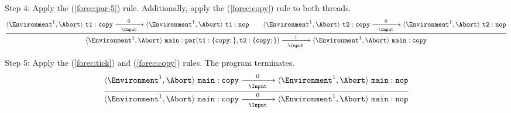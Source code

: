 \noindent
Step 4: Apply the (\ref{forec:par-5}) rule. Additionally, 
apply the (\ref{forec:copy}) rule to both threads.
{\footnotesize
\begin{equation*}
	\frac{
			\langle \Environment^1, \Abort \rangle ~ \mathtt{t1: copy}
				\xrightarrow[~~\Input~~]{0} 
			\langle \Environment^1, \Abort \rangle ~ \mathtt{t1: nop}
			\qquad
			\langle \Environment^1, \Abort \rangle ~ \mathtt{t2: copy}
				\xrightarrow[~~\Input~~]{0} 
			\langle \Environment^1, \Abort \rangle ~ \mathtt{t2: nop}
		}{
			\langle \Environment^1, \Abort \rangle ~ \mathtt{main: par(t1:\{copy;\},t2:\{copy;\})}
				\xrightarrow[~~\Input~~]{\bot} 
			\langle \Environment^1, \Abort \rangle ~ \mathtt{main: copy}
		}
\end{equation*}
}

\noindent
Step 5: Apply the (\ref{forec:tick}) and (\ref{forec:copy}) rules. The program
terminates.
{\footnotesize
\begin{equation*}
	\frac{
			\langle \Environment^1, \Abort \rangle ~ \mathtt{main: copy}
				\xrightarrow[~~\Input~~]{0} 
			\langle \Environment^1, \Abort \rangle ~ \mathtt{main: nop}
		}{
			\langle \Environment^1, \Abort \rangle ~ \mathtt{main: copy}
				\xrightarrow[~~\Input~~]{0} 
			\langle \Environment^1, \Abort \rangle ~ \mathtt{main: nop}
		}
\end{equation*}
}
